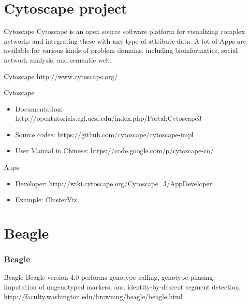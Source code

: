 \documentclass[UTF8]{beamer}
\begin{document}
\section{Cytoscape project}

\begin{frame}[t]{Cytoscape}
  Cytoscape is an open source software platform for visualizing complex networks
   and integrating these with any type of attribute data. A lot of Apps are
   available for various kinds of problem domains, including bioinformatics,
   social network analysis, and semantic web.
\end{frame}

\begin{frame}[t]{Cytoscape}
  http://www.cytoscape.org/
\end{frame}

\begin{frame}[t]{Cytoscape}
  \begin{itemize}
    \item Documentation: http://opentutorials.cgl.ucsf.edu/index.php/Portal:Cytoscape3
    \item Source codes: https://github.com/cytoscape/cytoscape-impl
    \item User Manual in Chinese: https://code.google.com/p/cytoscape-cn/
  \end{itemize}

\end{frame}

\begin{frame}[t]{Apps}
\begin{itemize}
  \item Developer: http://wiki.cytoscape.org/Cytoscape_3/AppDeveloper
  \item Example: ClusterViz
\end{itemize}

\end{frame}

\section{Beagle}
\begin{frame}
  \frametitle{Beagle}
  \begin{block}{Beagle}
    Beagle version 4.0 performs genotype calling, genotype phasing, imputation of ungenotyped markers, and identity-by-descent segment detection.\\
    http://faculty.washington.edu/browning/beagle/beagle.html
  \end{block}
\end{frame}
\end{document}
